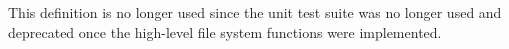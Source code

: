 
\begin{DoxyRefList}
\item[\label{deprecated__deprecated000001}%
\hypertarget{deprecated__deprecated000001}{}%
Global \hyperlink{glob__data_8h_a3178042a14309a5af3336234b7b0a9d1}{U\-N\-I\-T\-\_\-\-T\-E\-S\-T\-I\-N\-G} ]This definition is no longer used since the unit test suite was no longer used and deprecated once the high-\/level file system functions were implemented. 
\end{DoxyRefList}